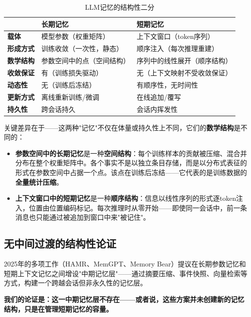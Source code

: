 \documentclass[11pt,a4paper]{ctexart}
\begin{document}
\begin{table}[htbp]
\centering
\caption{LLM记忆的结构性二分}
\label{tab:memory_dichotomy}
\begin{tabular}{@{}p{2.5cm}ll@{}}
\toprule
& \textbf{长期记忆} & \textbf{短期记忆} \\
\midrule
\textbf{载体}      & 模型参数（权重矩阵）      & 上下文窗口（token序列） \\
\textbf{形成方式}  & 训练收敛（一次性，静态）  & 顺序注入（每次推理重建） \\
\textbf{数学结构}  & 参数空间中的点（空间结构）& 序列中的线性展开（顺序结构） \\
\textbf{收敛保证}  & 有（训练损失驱动）        & 无（上下文映射不受收敛保证） \\
\textbf{动态性}    & 无（训练后冻结）          & 有顺序性，无时间性 \\
\textbf{更新方式}  & 离线重新训练/微调         & 在线追加/覆写 \\
\textbf{持久性}    & 跨会话持久                & 会话内挥发性 \\
\bottomrule
\end{tabular}
\end{table}

关键差异在于——这两种"记忆"不仅在体量或持久性上不同，它们的\textbf{数学结构}是不同的：

\begin{itemize}[leftmargin=*]
    \item \textbf{参数空间中的长期记忆}是一种\textbf{空间结构}：每个训练样本的贡献被压缩、混合并分布在整个权重矩阵中。各个事实不是以独立条目存储，而是以分布式表征的形式在参数空间中占据一个点。该点在训练后冻结——它代表的是训练数据的\textbf{全量统计压缩}。
    \item \textbf{上下文窗口中的短期记忆}是一种\textbf{顺序结构}：信息以线性序列的形式逐token注入，位置由位置编码标记。每次推理时从零开始——即使同一会话中，前一条消息也只能通过被追加到窗口中来"被记住"。
\end{itemize}

\subsection{无中间过渡的结构性论证}

2025年的多项工作（HAMR\cite{HAMR2025}、MemGPT、Memory Bear）提议在长期参数记忆和短期上下文记忆之间增设"中期记忆层"——通过摘要压缩、事件快照、向量检索等方式，构建一个跨越会话但非永久性的记忆层。

\textbf{我们的论证是：这一中期记忆层不存在——或者说，这些方案并未创建新的记忆\textbf{结构}，只是在管理短期记忆的\textbf{容量}。}
\end{document}
